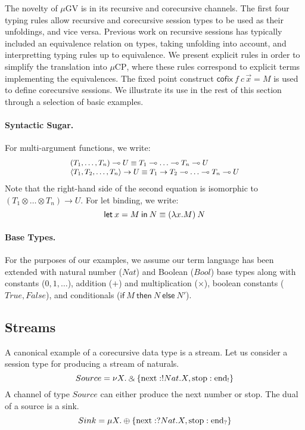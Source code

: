 \documentclass[orivec,envcountsame]{llncs}
\makeatletter
\newcommand{\with}{\mathbin\binampersand}
\newcommand{\lto}{\ensuremath{\multimap}}
\newcommand{\uto}{\ensuremath{\rightarrow}}
\newcommand{\outterm}{\mathrm{end}_!}
\newcommand{\interm}{\mathrm{end}_?}
\newcommand{\mkwd}[1]{\mathsf{#1}}
\newcommand{\clabel}[1]{\mathrm{#1}}
\newcommand{\lrkwd}{\mkwd{cofix}}
\newcommand{\gvfix}[3]{\lrkwd\:#1\:#2 = #3}
\newcommand{\gvifthen}[3]{\mkwd{if}\:#1\:\mkwd{then}\:#2\:\mkwd{else}\:#3}
\newcommand{\key}{\mkwd}
\newcommand{\mucp}{$\mu\mathrm{CP}$\xspace}
\newcommand{\mugv}{$\mu\mathrm{GV}$\xspace}
\newcommand{\ba}{\begin{array}}
\newcommand{\ea}{\end{array}}
\newcommand{\bl}{\ba[t]{@{}l@{}}}
\newcommand{\el}{\ea}
\newcommand{\secref}[1]{(\S\ref{sec:#1})}
\makeatother
\begin{document}
The novelty of \mugv is in its recursive and corecursive channels. The first four typing rules allow
recursive and corecursive session types to be used as their unfoldings, and vice versa. Previous
work on recursive sessions has typically included an equivalence relation on types, taking unfolding
into account, and interpretting typing rules up to equivalence. We present explicit rules in order
to simplify the translation into \mucp, where these rules correspond to explicit terms implementing
the equivalences.
%
The fixed point construct $\gvfix{f}{c\,\vec{x}}{M}$ is used to define corecursive sessions. We
illustrate its use in the rest of this section through a selection of basic examples.

\paragraph{Syntactic Sugar.}

For multi-argument functions, we write:
\[
\small
  \bl
  (T_1, \dots, T_n) \lto U \equiv T_1 \lto \dots \lto T_n \lto U \\
  \langle T_1, T_2, \dots, T_n \rangle \uto U \equiv T_1 \uto T_2 \lto \dots \lto T_n \lto U \\
  \el
\]
Note that the right-hand side of the second equation is isomorphic to $(T_1 \otimes \dots \otimes
T_n) \uto U$.
%
For let binding, we write:
\[
\small
\key{let}\:x=M\:\key{in}\:N \equiv (\lambda x.M)\:N
\]

\paragraph{Base Types.}

For the purposes of our examples, we assume our term language has been extended with natural number
($Nat$) and Boolean ($Bool$) base types along with constants ($0,1,\dots$),
addition ($+$) and multiplication ($\times$), boolean constants ($True, False$), and conditionals
($\gvifthen{M}{N}{N'}$).
%

\subsection{Streams}

A canonical example of a corecursive data type is a stream. Let us consider a session type for
producing a stream of naturals.
%
\[\small
Source = \nu X.\with \{\clabel{next}: !Nat.X, \clabel{stop}: \outterm \}
\]
%
A channel of type $Source$ can either produce the next number or stop. The dual of a source is a
sink.
\[\small
Sink = \mu X.\oplus \{\clabel{next}: ?Nat.X, \clabel{stop}: \interm \}
\]
\end{document}
